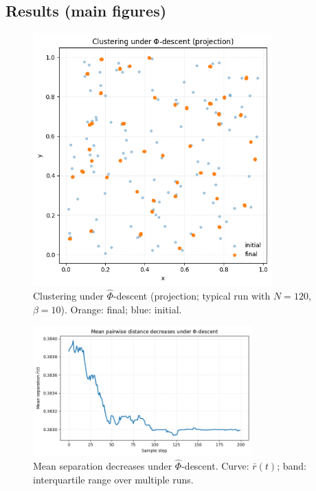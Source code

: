 \documentclass[aps,preprint,onecolumn,longbibliography,nofootinbib]{revtex4-2}
\numberwithin{equation}{section}        %
\begin{document}
\subsection{Results (main figures)}
\begin{figure}[H]
\centering
\includegraphics[width=0.82\textwidth]{clustering.png}
\caption{Clustering under $\widehat\Phi$-descent (projection; typical run with $N=120$, $\beta=10$). Orange: final; blue: initial.}
\label{fig:clustering}
\end{figure}

\begin{figure}[H]
\centering
\includegraphics[width=0.75\textwidth]{mean_distance.png}
\caption{Mean separation decreases under $\widehat\Phi$-descent. Curve: $\bar r(t)$; band: interquartile range over multiple runs.}
\label{fig:mean}
\end{figure}
\end{document}
